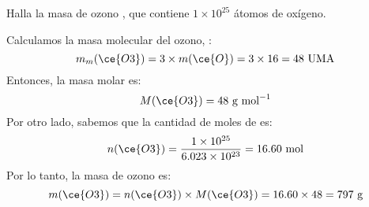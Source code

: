 Halla la masa de ozono , que contiene $1\times 10^{25}$ átomos de oxígeno.

\begin{solutionbox}{7cm}
    Calculamos la masa molecular del ozono, :
    \[ m_m(\ce{O3}) = 3 \times m(\ce{O}) = 3 \times 16 = 48 \text{ UMA} \]
    Entonces, la masa molar es:
    \[ M(\ce{O3}) = 48 \text{ g mol}^{-1} \]
    Por otro lado, sabemos que la cantidad de moles de  es:
    \[ n(\ce{O3}) = \frac{1\times 10^{25}}{6.023\times 10^{23}} = 16.60 \text{ mol} \]
    Por lo tanto, la masa de ozono es:
    \[ m(\ce{O3}) = n(\ce{O3}) \times M(\ce{O3}) = 16.60 \times 48 = 797 \text{ g} \]
\end{solutionbox}